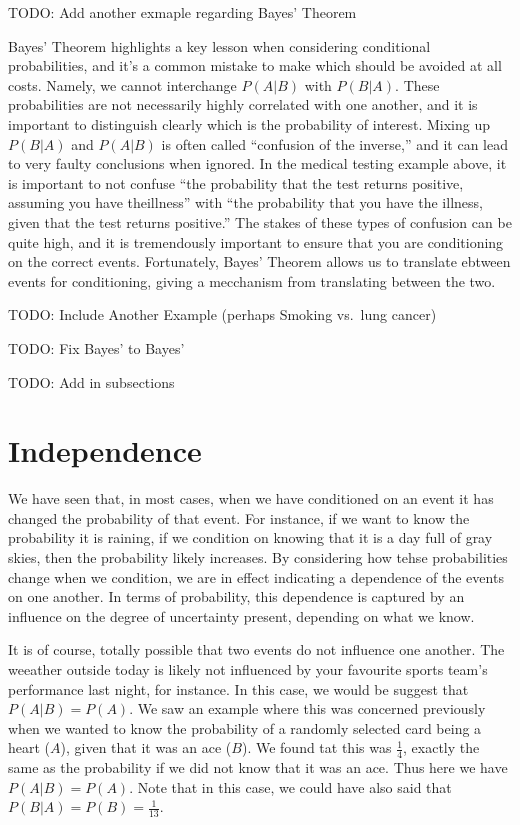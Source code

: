 \documentclass[
  letterpaper,
  DIV=11,
  numbers=noendperiod]{scrreprt}
\begin{document}
TODO: Add another exmaple regarding Bayes' Theorem

Bayes' Theorem highlights a key lesson when considering conditional
probabilities, and it's a common mistake to make which should be avoided
at all costs. Namely, we cannot interchange \(P(A|B)\) with \(P(B|A)\).
These probabilities are not necessarily highly correlated with one
another, and it is important to distinguish clearly which is the
probability of interest. Mixing up \(P(B|A)\) and \(P(A|B)\) is often
called ``confusion of the inverse,'' and it can lead to very faulty
conclusions when ignored. In the medical testing example above, it is
important to not confuse ``the probability that the test returns
positive, assuming you have theillness'' with ``the probability that you
have the illness, given that the test returns positive.'' The stakes of
these types of confusion can be quite high, and it is tremendously
important to ensure that you are conditioning on the correct events.
Fortunately, Bayes' Theorem allows us to translate ebtween events for
conditioning, giving a mecchanism from translating between the two.

TODO: Include Another Example (perhaps Smoking vs.~lung cancer)

TODO: Fix Bayes' to Bayes'

TODO: Add in subsections

\section{Independence}\label{independence}

We have seen that, in most cases, when we have conditioned on an event
it has changed the probability of that event. For instance, if we want
to know the probability it is raining, if we condition on knowing that
it is a day full of gray skies, then the probability likely increases.
By considering how tehse probabilities change when we condition, we are
in effect indicating a dependence of the events on one another. In terms
of probability, this dependence is captured by an influence on the
degree of uncertainty present, depending on what we know.

It is of course, totally possible that two events do not influence one
another. The weeather outside today is likely not influenced by your
favourite sports team's performance last night, for instance. In this
case, we would be suggest that \(P(A|B) = P(A)\). We saw an example
where this was concerned previously when we wanted to know the
probability of a randomly selected card being a heart (\(A\)), given
that it was an ace (\(B\)). We found tat this was \(\frac{1}{4}\),
exactly the same as the probability if we did not know that it was an
ace. Thus here we have \(P(A|B)=P(A)\). Note that in this case, we could
have also said that \(P(B|A)=P(B)=\frac{1}{13}\).
\end{document}
